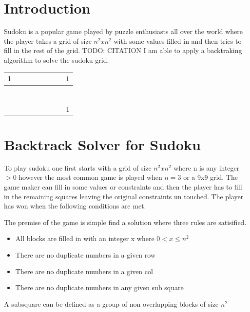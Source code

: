\documentclass{sig-alternate}
\begin{document}



\section{Introduction}
Sudoku is a popular game played by puzzle enthusiasts all over the world where the player takes 
a grid of size $n^2 x n^2$ with some values filled in and then tries to fill in the rest of the grid. TODO: CITATION
I am able to apply a backtraking algorithm to solve the sudoku grid. 

\begin{center}
  \begin{tabular}{ | c | c | c | c | c | c | c | c | c |}
    \hline
    	1 & & & & & & & & 1\\ \hline
        & & & & & & & & \\ \hline
        & & & & & & & & \\ \hline
        & & & & & & & & \\ \hline
        & & & & & & & & \\ \hline
        & & & & & & & & \\ \hline
        & & & & & & & & \\ \hline
        & & & & & & & & \\ \hline
        & & & & & & & & 1 \\
    \hline
  \end{tabular}
\end{center}

\section{Backtrack Solver for Sudoku}

To play sudoku one first starts with a grid of size $n^2 x n^2$ where n is any integer $> 0$ however the most common game is 
played when $n = 3$ or a 9x9 grid. The game maker can fill in some values or constraints and then the player has to fill in
the remaining squares leaving the original constraints un touched. The player has won when the following conditions are met.

The premise of the game is simple find a solution where three rules are satisified.
\begin{itemize}
\item{All blocks are filled in with an integer x where $0 < x \le n^2$}
\item{There are no duplicate numbers in a given row}
\item{There are no duplicate numbers in a given col}
\item{There are no duplicate numbers in any given sub square}
\end{itemize}
A subsquare can be defined as a group of non overlapping blocks of size $n^2$
\end{document}
